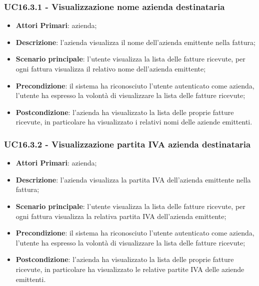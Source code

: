 \subsubsection{UC16.3.1 - Visualizzazione nome azienda destinataria}
\begin{itemize}
	\item \textbf{Attori Primari}: azienda;
	\item \textbf{Descrizione}: l'azienda visualizza il nome dell'azienda emittente nella fattura;
	\item \textbf{Scenario principale}: l'utente visualizza la lista delle fatture ricevute, per ogni fattura visualizza il relativo nome dell'azienda emittente;
	\item \textbf{Precondizione}: il sistema ha riconosciuto l'utente autenticato come azienda, l'utente ha espresso la volontà di visualizzare la lista delle fatture ricevute;
	\item \textbf{Postcondizione}: l'azienda ha visualizzato la lista delle proprie fatture ricevute, in particolare ha visualizzato i relativi nomi delle aziende emittenti.
\end{itemize} 
\subsubsection{UC16.3.2 - Visualizzazione partita IVA azienda destinataria}
\begin{itemize}
	\item \textbf{Attori Primari}: azienda;
	\item \textbf{Descrizione}: l'azienda visualizza la partita IVA dell'azienda emittente nella fattura;
	\item \textbf{Scenario principale}: l'utente visualizza la lista delle fatture ricevute, per ogni fattura visualizza la relativa partita IVA dell'azienda emittente;
	\item \textbf{Precondizione}: il sistema ha riconosciuto l'utente autenticato come azienda, l'utente ha espresso la volontà di visualizzare la lista delle fatture ricevute;
	\item \textbf{Postcondizione}: l'azienda ha visualizzato la lista delle proprie fatture ricevute, in particolare ha visualizzato le relative partite IVA delle aziende emittenti.
\end{itemize}  


